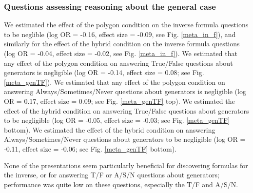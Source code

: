 \documentclass[man,mask,10pt]{apa6}
\begin{document}
\subsubsection{Questions assessing reasoning about the general case} We estimated the effect of the polygon condition on the inverse formula questions to be neglible (log OR = -0.16, effect size = -0.09, see Fig. \ref{meta_in_f}), and similarly for the effect of the hybrid condition on the inverse formula questions (log OR = -0.04, effect size = -0.02, see Fig. \ref{meta_in_f}). We estimated that any effect of the polygon condition on answering True/False questions about generators is negligible (log OR = -0.14, effect size = 0.08; see Fig. \ref{meta_genTF}). We estimated that any effect of the polygon condition on answering Always/Sometimes/Never questions about generators is negligible (log OR = 0.17, effect size = 0.09; see Fig. \ref{meta_genTF} top). We estimated the effect of the hybrid condition on answering True/False questions about generators to be negligible (log OR = -0.05, effect size = -0.03; see Fig. \ref{meta_genTF} bottom). We estimated the effect of the hybrid condition on answering Always/Sometimes/Never questions about generators to be negligible (log OR = -0.11, effect size = -0.06; see Fig. \ref{meta_genTF} bottom). \par
None of the presentations seem particularly beneficial for discovering formulas for the inverse, or for answering T/F or A/S/N questions about generators; performance was quite low on these questions, especially the T/F and A/S/N.
\end{document}
